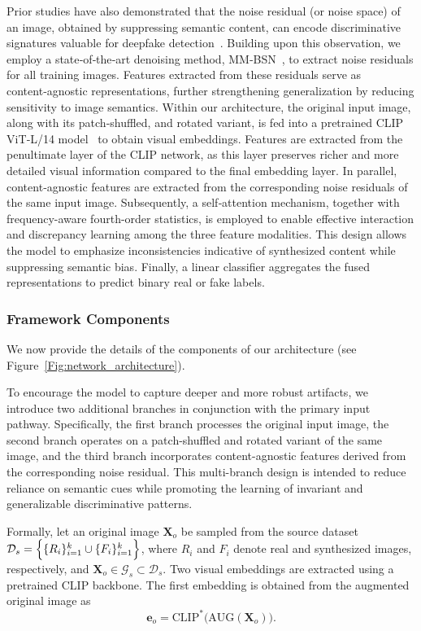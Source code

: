 \documentclass[letterpaper,twocolumn,10pt]{article}
\newcommand{\subhead}[1]{\vspace{1pt}\noindent{\textbf{#1.}}}
\newcommand{\bm}[1]{\mathbf{#1}} %
\begin{document}
Prior studies have also demonstrated that the noise residual (or noise space) of an image, obtained by suppressing semantic content, can encode discriminative signatures valuable for deepfake detection~\cite{Jiameng2020noisescope}. Building upon this observation, we employ a state‑of‑the‑art denoising method, MM‑BSN~\cite{Zhang2023mmbsn}, to extract noise residuals for all training images. Features extracted from these residuals serve as content‑agnostic representations, further strengthening generalization by reducing sensitivity to image semantics. Within our architecture, the original input image, along with its patch‑shuffled, and rotated variant, is fed into a pretrained CLIP ViT‑L/14 model~\cite{Radford2021Naturallanguage} to obtain visual embeddings. Features are extracted from the penultimate layer of the CLIP network, as this layer preserves richer and more detailed visual information compared to the final embedding layer. In parallel, content‑agnostic features are extracted from the corresponding noise residuals of the same input image. Subsequently, a self‑attention mechanism, together with frequency-aware fourth-order statistics, is employed to enable effective interaction and discrepancy learning among the three feature modalities. This design allows the model to emphasize inconsistencies indicative of synthesized content while suppressing semantic bias. Finally, a linear classifier aggregates the fused representations to predict binary real or fake labels. 

\subsubsection{Framework Components} 
We now provide the details of the components of our architecture (see Figure~\ref{Fig:network_architecture}).

\subhead{Triple-path discrepancy learning} To encourage the model to capture deeper and more robust artifacts, we introduce two additional branches in conjunction with the primary input pathway. Specifically, the first branch processes the original input image, the second branch operates on a patch-shuffled and rotated variant of the same image, and the third branch incorporates content-agnostic features derived from the corresponding noise residual. This multi-branch design is intended to reduce reliance on semantic cues while promoting the learning of invariant and generalizable discriminative patterns. 

Formally, let an original image $\bm{X}_o$ be sampled from the source dataset $\mathcal{D}_s = \Bigl\{ \{R_i\}_{i=1}^{k} \cup \{F_i\}_{i=1}^{k} \Bigr\}$, where $R_i$ and $F_i$ denote real and synthesized images, respectively, and $\bm{X}_o \in \mathcal{G}_s \subset \mathcal{D}_s$. Two visual embeddings are extracted using a pretrained CLIP backbone. The first embedding is obtained from the augmented original image as
\begin{equation}
	\bm{e}_o = \mathrm{CLIP}^*\bigl(\mathrm{AUG}(\bm{X}_o)\bigr).
\end{equation}
\end{document}
